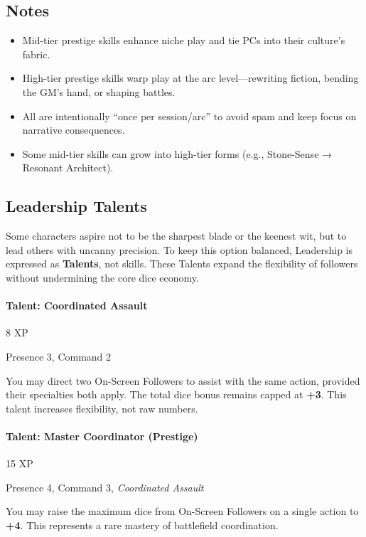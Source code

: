 \documentclass[12pt]{article}
\begin{document}
\subsection*{Notes}
\begin{itemize}
  \item Mid-tier prestige skills enhance niche play and tie PCs into their culture’s fabric.  
  \item High-tier prestige skills warp play at the arc level—rewriting fiction, bending the GM’s hand, or shaping battles.  
  \item All are intentionally “once per session/arc” to avoid spam and keep focus on narrative consequences.  
  \item Some mid-tier skills can grow into high-tier forms (e.g., Stone-Sense → Resonant Architect).  
\end{itemize}

\subsection*{Leadership Talents}

Some characters aspire not to be the sharpest blade or the keenest wit, but to lead others with uncanny precision. To keep this option balanced, Leadership is expressed as \textbf{Talents}, not skills. These Talents expand the flexibility of followers without undermining the core dice economy.

\paragraph{Talent: Coordinated Assault}
\begin{description}[leftmargin=2cm]
  \item[Cost:] 8 XP
  \item[Requirements:] Presence 3, Command 2
  \item[Effect:] You may direct two On-Screen Followers to assist with the same action, provided their specialties both apply. The total dice bonus remains capped at \textbf{+3}. This talent increases flexibility, not raw numbers.
\end{description}

\paragraph{Talent: Master Coordinator (Prestige)}
\begin{description}[leftmargin=2cm]
  \item[Cost:] 15 XP
  \item[Requirements:] Presence 4, Command 3, \emph{Coordinated Assault}
  \item[Effect:] You may raise the maximum dice from On-Screen Followers on a single action to \textbf{+4}. This represents a rare mastery of battlefield coordination.
\end{description}
\end{document}
